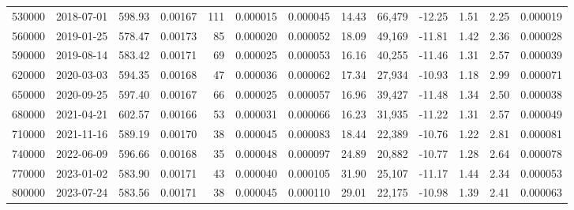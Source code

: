 \begin{tabular}{rlllrrrllllll}
\toprule
\midrule
530000 & 2018-07-01 & 598.93 & 0.00167 & 111 & 0.000015 & 0.000045 & 14.43 & 66,479 & -12.25 & 1.51 & 2.25 & 0.000019 \\
560000 & 2019-01-25 & 578.47 & 0.00173 & 85 & 0.000020 & 0.000052 & 18.09 & 49,169 & -11.81 & 1.42 & 2.36 & 0.000028 \\
590000 & 2019-08-14 & 583.42 & 0.00171 & 69 & 0.000025 & 0.000053 & 16.16 & 40,255 & -11.46 & 1.31 & 2.57 & 0.000039 \\
620000 & 2020-03-03 & 594.35 & 0.00168 & 47 & 0.000036 & 0.000062 & 17.34 & 27,934 & -10.93 & 1.18 & 2.99 & 0.000071 \\
650000 & 2020-09-25 & 597.40 & 0.00167 & 66 & 0.000025 & 0.000057 & 16.96 & 39,427 & -11.48 & 1.34 & 2.50 & 0.000038 \\
680000 & 2021-04-21 & 602.57 & 0.00166 & 53 & 0.000031 & 0.000066 & 16.23 & 31,935 & -11.22 & 1.31 & 2.57 & 0.000049 \\
710000 & 2021-11-16 & 589.19 & 0.00170 & 38 & 0.000045 & 0.000083 & 18.44 & 22,389 & -10.76 & 1.22 & 2.81 & 0.000081 \\
740000 & 2022-06-09 & 596.66 & 0.00168 & 35 & 0.000048 & 0.000097 & 24.89 & 20,882 & -10.77 & 1.28 & 2.64 & 0.000078 \\
770000 & 2023-01-02 & 583.90 & 0.00171 & 43 & 0.000040 & 0.000105 & 31.90 & 25,107 & -11.17 & 1.44 & 2.34 & 0.000053 \\
800000 & 2023-07-24 & 583.56 & 0.00171 & 38 & 0.000045 & 0.000110 & 29.01 & 22,175 & -10.98 & 1.39 & 2.41 & 0.000063 \\
\bottomrule
\end{tabular}
